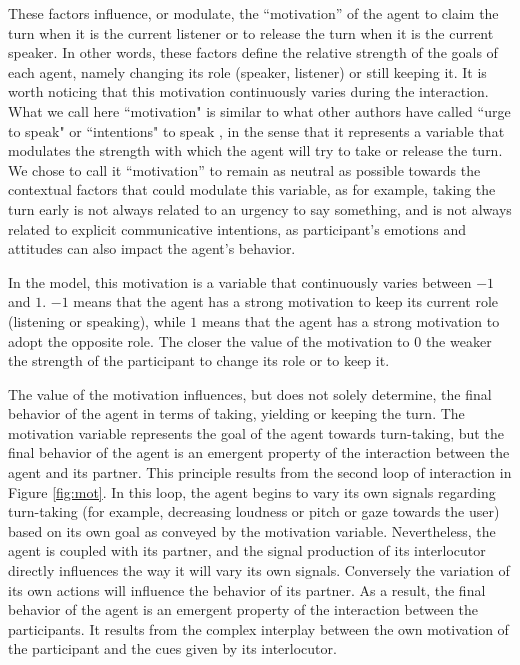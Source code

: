 These factors influence, or modulate, the ``motivation'' of the agent to claim the turn when it is the current listener or to release the turn when it is the current speaker. 
In other words, these factors define the relative strength of the goals of each agent, namely changing its role (speaker, listener) or still keeping it. It is worth noticing that this motivation continuously varies during the interaction. 
What we call here ``motivation" is similar to what other authors have called ``urge to speak" \citep{thorisson_multiparty_2010} or ``intentions"  to speak \citep{lessmann_towards_2004}, in the sense that it represents a variable that modulates the strength with which the agent will try to take or release the turn. We chose to call it ``motivation'' to remain as neutral as possible towards the contextual factors that could modulate this variable, as for example, taking the turn early is not always related to an urgency to say something, and is not always related to explicit communicative intentions, as participant's emotions and attitudes can also impact the agent's behavior. 

In the  model, this motivation is a variable that continuously varies between $-1$ and $1$. 
$-1$ means that the agent has a strong motivation to keep its current role (listening or speaking), while
$1$ means that the agent has a strong motivation to adopt the opposite role. 
The closer the value of the motivation to $0$ the weaker the strength of the participant to change its role or to keep it. 

The value of the motivation influences, but does not solely determine, the final behavior of the agent in terms of taking, yielding or keeping the turn. The motivation variable represents the goal of the agent towards turn-taking, but the final behavior of the agent is an emergent property of the interaction between the agent and its partner. 
This principle results from the second loop of interaction in Figure \ref{fig:mot}. 
In this loop, the agent begins to vary its own signals regarding turn-taking (for example, decreasing loudness or pitch or gaze towards the user) based on its own goal as conveyed by the motivation variable. Nevertheless, the agent is coupled with its partner, and the signal production of its interlocutor directly influences the way it will vary its own signals.
Conversely the variation of its own actions will influence the behavior of its partner. 
As a result, the final behavior of the agent
is an emergent property of the interaction between the participants.
It results from the complex interplay between the own motivation of the participant and the cues given by its interlocutor.

